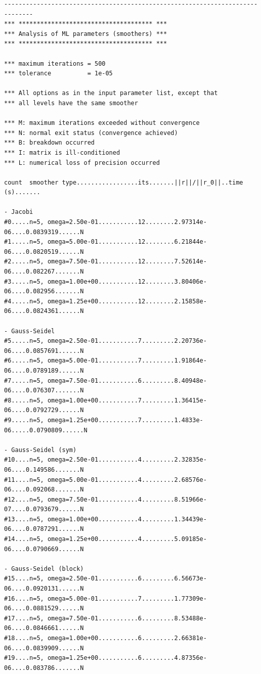 \documentclass{article}[11pt]
\begin{document}
\begin{verbatim}
------------------------------------------------------------------------------
*** ************************************* ***
*** Analysis of ML parameters (smoothers) ***
*** ************************************* ***

*** maximum iterations = 500
*** tolerance          = 1e-05

*** All options as in the input parameter list, except that
*** all levels have the same smoother

*** M: maximum iterations exceeded without convergence
*** N: normal exit status (convergence achieved)
*** B: breakdown occurred
*** I: matrix is ill-conditioned
*** L: numerical loss of precision occurred

count  smoother type.................its.......||r||/||r_0||..time (s).......

- Jacobi
#0.....n=5, omega=2.50e-01...........12........2.97314e-06....0.0839319......N
#1.....n=5, omega=5.00e-01...........12........6.21844e-06....0.0820519......N
#2.....n=5, omega=7.50e-01...........12........7.52614e-06....0.082267.......N
#3.....n=5, omega=1.00e+00...........12........3.80406e-06....0.082956.......N
#4.....n=5, omega=1.25e+00...........12........2.15858e-06....0.0824361......N

- Gauss-Seidel
#5.....n=5, omega=2.50e-01...........7.........2.20736e-06....0.0857691......N
#6.....n=5, omega=5.00e-01...........7.........1.91864e-06....0.0789189......N
#7.....n=5, omega=7.50e-01...........6.........8.40948e-06....0.076307.......N
#8.....n=5, omega=1.00e+00...........7.........1.36415e-06....0.0792729......N
#9.....n=5, omega=1.25e+00...........7.........1.4833e-06.....0.0790809......N

- Gauss-Seidel (sym)
#10....n=5, omega=2.50e-01...........4.........2.32835e-06....0.149586.......N
#11....n=5, omega=5.00e-01...........4.........2.68576e-06....0.092068.......N
#12....n=5, omega=7.50e-01...........4.........8.51966e-07....0.0793679......N
#13....n=5, omega=1.00e+00...........4.........1.34439e-06....0.0787291......N
#14....n=5, omega=1.25e+00...........4.........5.09185e-06....0.0790669......N

- Gauss-Seidel (block)
#15....n=5, omega=2.50e-01...........6.........6.56673e-06....0.0920131......N
#16....n=5, omega=5.00e-01...........7.........1.77309e-06....0.0881529......N
#17....n=5, omega=7.50e-01...........6.........8.53488e-06....0.0846661......N
#18....n=5, omega=1.00e+00...........6.........2.66381e-06....0.0839909......N
#19....n=5, omega=1.25e+00...........6.........4.87356e-06....0.083786.......N


\end{verbatim}
\end{document}
